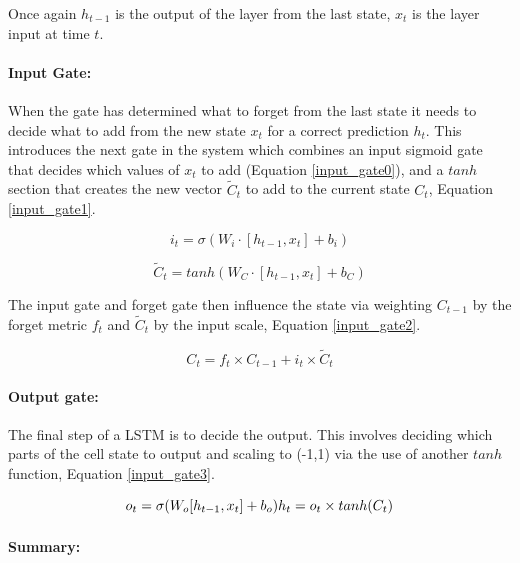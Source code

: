 \documentclass[11pt,twoside]{report}
\begin{document}
Once again $h_{t-1}$ is the output of the layer from the last state, $x_{t}$ is the layer input at time $t$.

\paragraph{Input Gate:} When the gate has determined what to forget from the last state it needs to decide what to add from the new state $x_{t}$ for a correct prediction $h_{t}$. This introduces the next gate in the system which combines an input sigmoid gate that decides which values of $x_{t}$ to add (Equation \ref{input_gate0}), and a $tanh$ section that creates the new vector $\tilde{C}_{t}$ to add to the current state $C_{t}$, Equation \ref{input_gate1}.



\begin{equation}
\mathit{i}_{t} = \sigma (W_{i} \cdot [h_{t-1},x_{t}] + b_{i})
\label{input_gate0}
\end{equation}

\begin{equation}
\tilde{C}_{t} = tanh(W_{C} \cdot [h_{t-1},x_{t}] + b_{C})
\label{input_gate1}
\end{equation}



The input gate and forget gate then influence the state via weighting $C_{t-1}$ by the forget metric $f_{t}$ and $\tilde{C}_{t}$ by the input scale, Equation \ref{input_gate2}.

\begin{equation}
C_{t} = f_{t} \times C_{t-1} + i_{t} \times \tilde{C}_{t}
\label{input_gate2}
\end{equation}

\paragraph{Output gate:} The final step of a LSTM is to decide the output. This involves deciding which parts of the cell state to output and scaling to (-1,1) via the use of another $tanh$ function, Equation \ref{input_gate3}.


\begin{equation}
o_{t} = \sigma (W_{o}[h_{t-1},x_{t}] + b_{o}) \\
h_{t} = o_{t} \times tanh(C_{t})
\label{input_gate3}
\end{equation}

\paragraph{Summary:}
\end{document}
